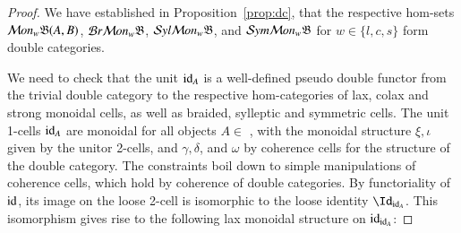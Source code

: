 \begin{proof}
We have established in Proposition~\ref{prop:dc}, that the respective hom-sets $\mathcal{M} on_w \mathfrak{B}(A,B)$, $\mathcal{B} r \mathcal{M} on_w\mathfrak{B}$, $\mathcal{S} yl \mathcal{M} on_w\mathfrak{B}$, and $\mathcal{S} ym \mathcal{M} on_w\mathfrak{B}$ for $w \in \{l,c,s\}$ form double categories. 

We need to check that the unit $\mathrm{id}_A$ is a well-defined pseudo double functor from the trivial double category to the respective hom-categories of lax, colax and strong monoidal cells, as well as braided, sylleptic and symmetric cells. 
The unit 1-cells $\mathrm{id}_A$ are monoidal for all objects $A \in$ \fB,  with the monoidal structure $\xi, \iota$ given by the unitor 2-cells, and $\gamma, \delta$, and $\omega$ by coherence cells for the structure of the double category. The constraints boil down to simple manipulations of coherence cells, which hold by coherence of double categories. By functoriality of $\mathrm{id}$, its image on the loose 2-cell  is isomorphic to the loose identity $\looseid_{\transid_A}$. This isomorphism gives rise to the following lax monoidal structure on $\mathrm{id}_{\mathrm{id}_A}$: 


\end{proof}
